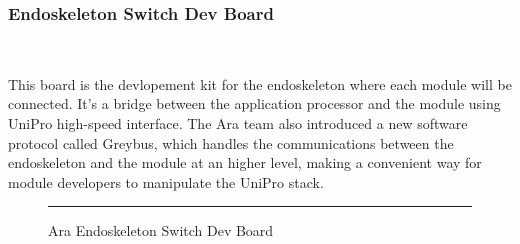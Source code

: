 \subsubsection{Endoskeleton Switch Dev Board}\

This board is the devlopement kit for the endoskeleton where each module will be connected.
It's a bridge between the application processor and the module using UniPro high-speed interface.
The Ara team also introduced a new software protocol called Greybus, which handles the communications between the endoskeleton and the module at an higher level, making a convenient way for module developers to manipulate the UniPro stack.
\begin{figure}[htbp]
  \centering
    \rule{35em}{0.5pt}
  \caption[Ara Endoskeleton Switch Board]{Ara Endoskeleton Switch Dev Board}
  \label{fig:endo}
\end{figure}
